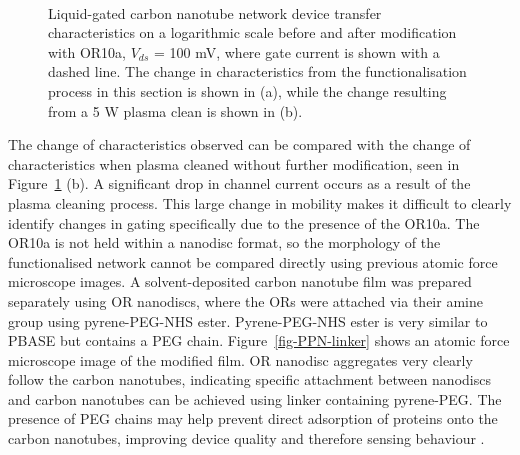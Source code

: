 \documentclass[
  a4paper,
]{scrbook}
\begin{document}
\begin{figure}
\begin{minipage}[t]{0.45\linewidth}
{{}

}

\end{minipage}%
%
\begin{minipage}[t]{0.01\linewidth}

{\centering 

~

}

\end{minipage}%

\caption[Liquid-gated carbon nanotube network device transfer
characteristics on a logarithmic scale before and after modification
with OR10a, compared to liquid-gated characteristics before and after a
5 W plasma clean.]{\label{fig-OR10a-TX-comparison}Liquid-gated carbon
nanotube network device transfer characteristics on a logarithmic scale
before and after modification with OR10a, \(V_{ds}\) = 100 mV, where
gate current is shown with a dashed line. The change in characteristics
from the functionalisation process in this section is shown in (a),
while the change resulting from a 5 W plasma clean is shown in (b).}

\end{figure}

The change of characteristics observed can be compared with the change
of characteristics when plasma cleaned without further modification,
seen in Figure~\ref{fig-OR10a-TX-comparison} (b). A significant drop in
channel current occurs as a result of the plasma cleaning process. This
large change in mobility makes it difficult to clearly identify changes
in gating specifically due to the presence of the OR10a. The OR10a is
not held within a nanodisc format, so the morphology of the
functionalised network cannot be compared directly using previous atomic
force microscope images. A solvent-deposited carbon nanotube film was
prepared separately using OR nanodiscs, where the ORs were attached via
their amine group using pyrene-PEG-NHS ester. Pyrene-PEG-NHS ester is
very similar to PBASE but contains a PEG chain.
Figure~\ref{fig-PPN-linker} shows an atomic force microscope image of
the modified film. OR nanodisc aggregates very clearly follow the carbon
nanotubes, indicating specific attachment between nanodiscs and carbon
nanotubes can be achieved using linker containing pyrene-PEG. The
presence of PEG chains may help prevent direct adsorption of proteins
onto the carbon nanotubes, improving device quality and therefore
sensing behaviour \autocite{Star2003a,Chen2004}.
\end{document}
